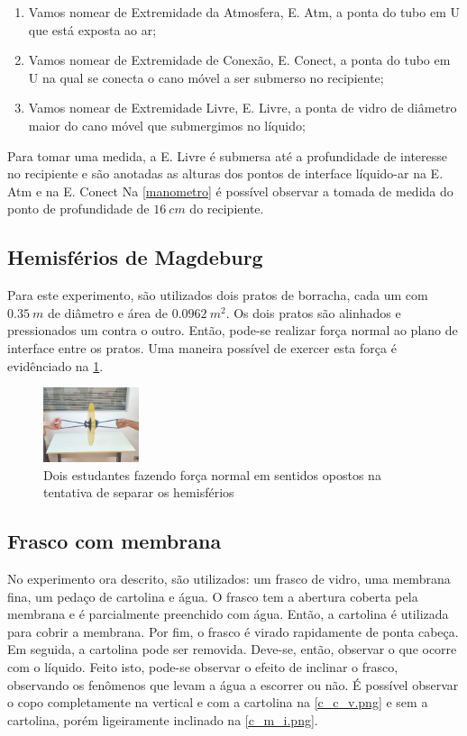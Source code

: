     \begin{enumerate}
        \item Vamos nomear de Extremidade da Atmosfera, E. Atm, a ponta do tubo em U que está exposta ao ar;
        \item Vamos nomear de Extremidade de Conexão, E. Conect, a ponta do tubo em U na qual se conecta o cano móvel a ser submerso no recipiente;
        \item Vamos nomear de Extremidade Livre, E. Livre, a ponta de vidro de diâmetro maior do cano móvel que submergimos no líquido;
    \end{enumerate}


    Para tomar uma medida, a E. Livre é submersa até a profundidade de interesse no recipiente e são anotadas as alturas dos pontos de interface líquido-ar na E. Atm e na E. Conect Na \cref{manometro} é possível observar a tomada de medida do ponto de profundidade de \(\qty{16}{cm}\) do recipiente.

\subsection{Hemisférios de Magdeburg}

    Para este experimento, são utilizados dois pratos de borracha, cada um com \(\qty{0,35}{m}\) de diâmetro e área de \(\qty{0,0962}{m^2}\). Os dois pratos são alinhados e pressionados um contra o outro. Então, pode-se realizar força normal ao plano de interface entre os pratos. Uma maneira possível de exercer esta força é evidênciado na \cref{foto_hemisferio.png}.

\begin{figure}[H]
    \centering
    \includegraphics[width=0.25\textwidth]{fig/Cortada.jpeg}
    \caption{Dois estudantes fazendo força normal em sentidos opostos na tentativa de separar os hemisférios}
    \label{foto_hemisferio.png}
\end{figure}


\subsection{Frasco com membrana}
    No experimento ora descrito, são utilizados: um frasco de vidro, uma membrana fina, um pedaço de cartolina e água. O frasco tem a abertura coberta pela membrana e é parcialmente preenchido com água. Então, a cartolina é utilizada para cobrir a membrana. Por fim, o frasco é virado rapidamente de ponta cabeça. Em seguida, a cartolina pode ser removida. Deve-se, então, observar o que ocorre com o líquido. Feito isto, pode-se observar o efeito de inclinar o frasco, observando os fenômenos que levam a água a escorrer ou não. É possível observar o copo completamente na vertical e com a cartolina na \cref{c_c_v.png} e sem a cartolina, porém ligeiramente inclinado na \cref{c_m_i.png}.

